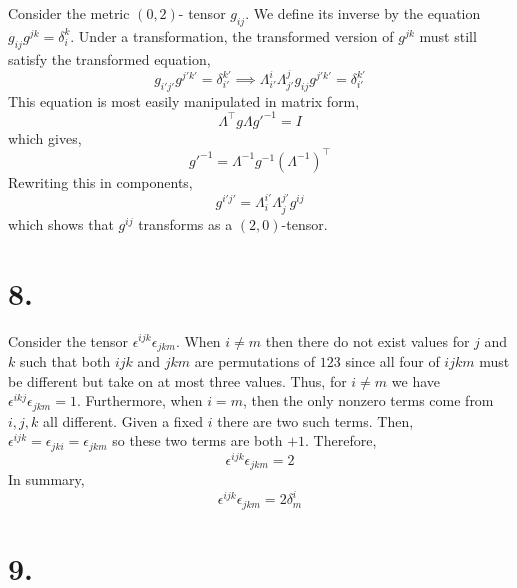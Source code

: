 \documentclass[12pt]{article}
\begin{document}
Consider the metric $(0,2)$- tensor $g_{ij}$. We define its inverse by the equation $g_{ij} g^{jk} = \delta_i^k$. Under a transformation, the transformed version of $g^{jk}$ must still satisfy the transformed equation,
\[ g_{i'j'} g^{j' k'} = \delta_{i'}^{k'} \implies  \Lambda^i_{i'} \Lambda^j_{j'} g_{ij} g^{j' k'} = \delta_{i'}^{k'} \] 
This equation is most easily manipulated in matrix form,
\[ \Lambda^{\top} g \Lambda g'^{-1} = I \]
which gives,
\[ g'^{-1} =  \Lambda^{-1} g^{-1} (\Lambda^{-1})^{\top} \]
Rewriting this in components,
\[ g^{i'j'} = \Lambda^{i'}_i \Lambda^{j'}_j g^{ij} \]
which shows that $g^{ij}$ transforms as a $(2,0)$-tensor. 

\section*{8.}

Consider the tensor $\epsilon^{ijk} \epsilon_{jkm}$. When $i \neq m$ then there do not exist values for $j$ and $k$ such that both $ijk$ and $jkm$ are permutations of $123$ since all four of $ijkm$ must be different but take on at most three values. Thus, for $i \neq m$ we have $\epsilon^{ikj} \epsilon_{jkm} = 1$. Furthermore, when $i = m$, then the only nonzero terms come from $i, j, k$ all different. Given a fixed $i$ there are two such terms. Then, $\epsilon^{ijk} = \epsilon_{jki} = \epsilon_{jkm}$ so these two terms are both $+1$. Therefore,
\[ \epsilon^{ijk} \epsilon_{jkm} = 2 \]
In summary,
\[ \epsilon^{ijk} \epsilon_{jkm} = 2 \delta^i_m \]  

\section*{9.}
\end{document}
